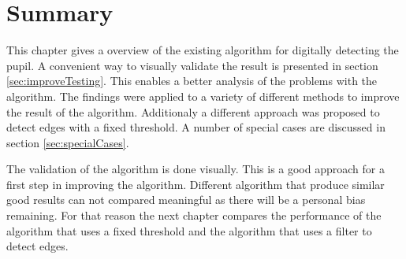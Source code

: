 \section{Summary}
This chapter gives a overview of the existing algorithm for digitally detecting the pupil. A convenient way to visually validate the result is presented in section \ref{sec:improveTesting}. This enables a better analysis of the problems with the algorithm. The findings were applied to a variety of different methods to improve the result of the algorithm. Additionaly a different approach was proposed to detect edges with a fixed threshold. A number of special cases are discussed in section \ref{sec:specialCases}.

The validation of the algorithm is done visually. This is a good approach for a first step in improving the algorithm. Different algorithm that produce similar good results can not compared meaningful as there will be a personal bias remaining. For that reason the next chapter compares the performance of the algorithm that uses a fixed threshold and the algorithm that uses a filter to detect edges.



